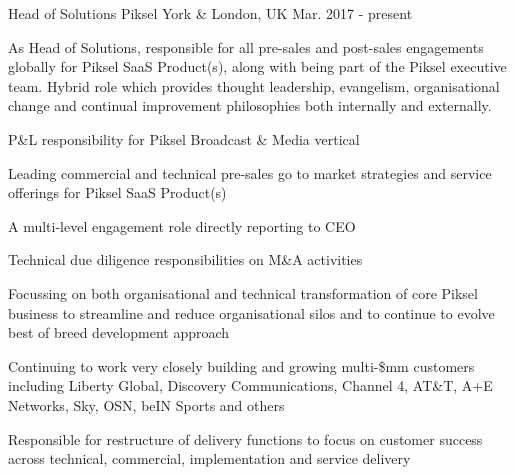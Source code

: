 


\begin{cventries}


\cvexpentry
{Head of Solutions} %
{Piksel} %
{York \& London, UK} %
{Mar. 2017 - present} %
{
\begin{cvitemstitle}
\item {As Head of Solutions, responsible for all pre-sales and post-sales engagements globally for Piksel SaaS Product(s), along with being part of the Piksel executive team. Hybrid role which provides thought leadership, evangelism, organisational change and continual improvement philosophies both internally and externally.}
\end{cvitemstitle}
}
{ %
\begin{cvitems}
\item {P\&L responsibility for Piksel Broadcast \& Media vertical}
\item {Leading commercial and technical pre-sales go to market strategies and service offerings for Piksel SaaS Product(s)}
\item {A multi-level engagement role directly reporting to CEO}
\item {Technical due diligence responsibilities on M\&A activities}
\item {Focussing on both organisational and technical transformation of core Piksel business to streamline and reduce organisational silos and to continue to evolve best of breed development approach}
\item {Continuing to work very closely building and growing multi-\$mm customers including Liberty Global, Discovery Communications, Channel 4, AT\&T, A+E Networks, Sky, OSN, beIN Sports and others}
\item {Responsible for restructure of delivery functions to focus on customer success across technical, commercial, implementation and service delivery}
\end{cvitems}
}


\end{cventries}
